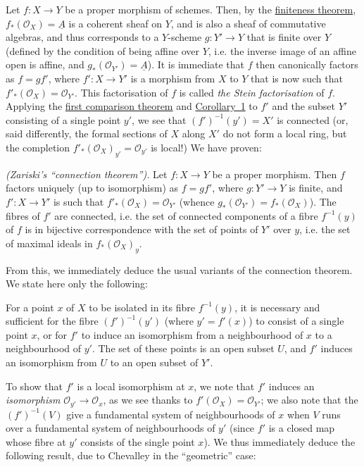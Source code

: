 \documentclass{article}
\theoremstyle{plain}
\newenvironment{theorem}[1]
  {\renewcommand\theinnercustomtheorem{#1}\innercustomtheorem}
  {\endinnercustomtheorem}
\newenvironment{corollary}[1]
  {\renewcommand\theinnercustomcorollary{#1}\innercustomcorollary}
  {\endinnercustomcorollary}
\theoremstyle{definition}
\newcommand{\sh}[1]{{\mathscr{#1}}}
\newcommand{\oldpage}[1]{\marginpar{\footnotesize$\Big\vert$ \textit{p.~#1}}}
\begin{document}
Let $f\colon X\to Y$ be a proper morphism of schemes.
Then, by the \hyperref[theorem1]{finiteness theorem}, $f_*(\sh{O}_X)=\underline{A}$ is a coherent sheaf on $Y$, and is also a sheaf of commutative algebras, and thus corresponds to a $Y$-scheme $g\colon Y'\to Y$ that is finite over $Y$ (defined by the condition of being affine over $Y$, i.e. the inverse image of an affine open is affine, and $g_*(\sh{O}_{Y'})=\underline{A}$).
It is immediate that $f$ then canonically factors as $f=gf'$, where $f'\colon X\to Y'$ is a morphism from $X$ to $Y$ that is now such that $f'_*(\sh{O}_X)=\sh{O}_{Y'}$.
This factorisation of $f$ is called \emph{the Stein factorisation} of $f$.
Applying the \hyperref[theorem2]{first comparison theorem} and \hyperref[theorem2corollary1]{Corollary~1} to $f'$ and the subset $Y'$ consisting of a single point $y'$, we see that $(f')^{-1}(y')=X'$ is connected (or, said differently, the formal sections of $X$ along $X'$ do not form a local ring, but the completion $f'_*(\sh{O}_X)_{y'}=\sh{O}_{y'}$ is local!)
We have proven:

\begin{theorem}{5}
\label{theorem5}
  \emph{(Zariski's ``connection theorem'').}
  Let $f\colon X\to Y$ be a proper morphism.
  Then $f$ factors uniquely (up to isomorphism) as $f=gf'$, where $g\colon Y'\to Y$ is finite, and $f'\colon X\to Y'$ is such that $f'_*(\sh{O}_X)=\sh{O}_{Y'}$ (whence $g_*(\sh{O}_{Y'})=f_*(\sh{O}_X)$).
  The fibres of $f'$ are connected,
\oldpage{182-06}
  i.e. the set of connected components of a fibre $f^{-1}(y)$ of $f$ is in bijective correspondence with the set of points of $Y'$ over $y$, i.e. the set of maximal ideals in $f_*(\sh{O}_X)_y$.
\end{theorem}

From this, we immediately deduce the usual variants of the connection theorem.
We state here only the following:

\begin{corollary}{1}
\label{theorem5corollary1}
  For a point $x$ of $X$ to be isolated in its fibre $f^{-1}(y)$, it is necessary and sufficient for the fibre $(f')^{-1}(y')$ (where $y'=f'(x)$) to consist of a single point $x$, or for $f'$ to induce an isomorphism from a neighbourhood of $x$ to a neighbourhood of $y'$.
  The set of these points is an open subset $U$, and $f'$ induces an isomorphism from $U$ to an open subset of $Y'$.
\end{corollary}

To show that $f'$ is a local isomorphism at $x$, we note that $f'$ induces an \emph{isomorphism} $\sh{O}_{y'}\to\sh{O}_x$, as we see thanks to $f'(\sh{O}_X)=\sh{O}_{Y'}$;
we also note that the $(f')^{-1}(V)$ give a fundamental system of neighbourhoods of $x$ when $V$ runs over a fundamental system of neighbourhoods of $y'$ (since $f'$ is a closed map whose fibre at $y'$ consists of the single point $x$).
We thus immediately deduce the following result, due to Chevalley in the ``geometric'' case:
\end{document}
